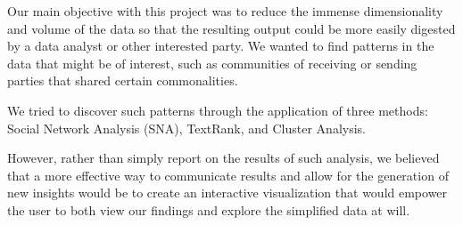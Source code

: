 Our main objective with this project was to reduce the immense dimensionality and volume of the data so that the resulting output could be more easily digested by a data analyst or other interested party. We wanted to find patterns in the data that might be of interest, such as communities of receiving or sending parties that shared certain commonalities. 

We tried to discover such patterns through the application of three methods: Social Network Analysis (SNA), TextRank, and Cluster Analysis.

However, rather than simply report on the results of such analysis, we believed that a more effective way to communicate results and allow for the generation of new insights would be to create an interactive visualization that would empower the user to both view our findings and explore the simplified data at will.
